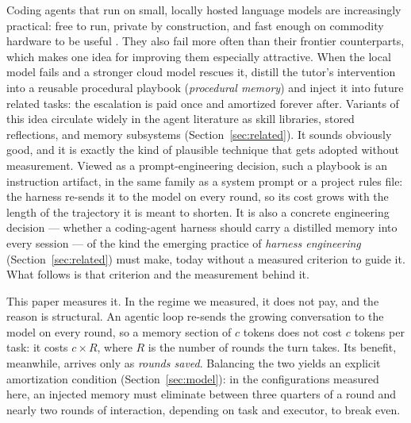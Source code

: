 \documentclass[smallcondensed,natbib]{svjour3}
\begin{document}
Coding agents that run on small, locally hosted language models are
increasingly practical: free to run, private by construction, and fast
enough on commodity hardware to be useful
\citep{lu2024smalllm,corradini2025}. They also fail more often than
their frontier counterparts, which makes one idea for improving them
especially attractive. When the local model fails and a stronger cloud
model rescues it, distill the tutor's intervention into a reusable
procedural playbook (\emph{procedural memory}) and inject it into
future related tasks: the escalation is paid once and amortized
forever after. Variants of this idea circulate widely in the agent
literature as skill libraries, stored reflections, and memory
subsystems (Section~\ref{sec:related}). It sounds obviously good, and
it is exactly the kind of plausible technique that gets adopted
without measurement.
Viewed as a prompt-engineering decision, such a playbook is an
instruction artifact, in the same family as a system prompt or a
project rules file: the harness re-sends it to the model on every round,
so its cost grows with the length of the trajectory it is meant to
shorten. It is also a concrete engineering decision ---
whether a coding-agent harness should carry a distilled memory into
every session --- of the kind the emerging practice of \emph{harness
engineering} (Section~\ref{sec:related}) must make, today without a
measured criterion to guide it. What follows is that criterion and the
measurement behind it.

This paper measures it. In the regime we measured, it does not pay,
and the reason is structural. An agentic loop re-sends the
growing conversation to the model on every round, so a memory section
of $c$ tokens does not cost $c$ tokens per task: it costs $c \times
R$, where $R$ is the number of rounds the turn takes. Its benefit,
meanwhile, arrives only as \emph{rounds saved}. Balancing the two
yields an explicit amortization condition
(Section~\ref{sec:model}): in the configurations measured here, an
injected memory must eliminate between three quarters of a round and
nearly two rounds of interaction, depending on task and executor, to
break even.
\end{document}
